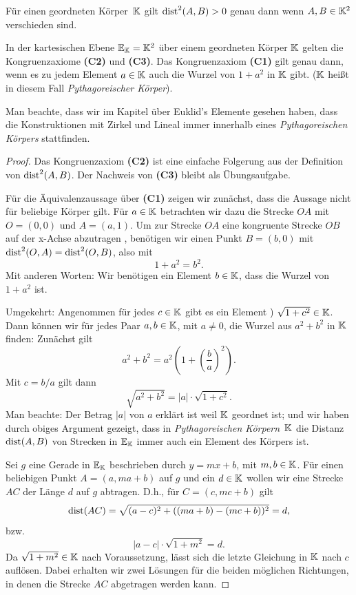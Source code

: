 Für einen geordneten Körper~$\mathbb K$ gilt $\operatorname{dist}^2(A,B)>0$ genau dann wenn
$A, B\in \mathbb K^2$ verschieden sind.


\begin{thm}
In der kartesischen Ebene $\mathbb E_{\mathbb K}=\mathbb K^2$ über einem geordneten Körper
$\mathbb K$ gelten die  Kongruenzaxiome {\bf (C2)} und  {\bf (C3)}. Das
Kongruenzaxiom  {\bf (C1)}
gilt genau dann, wenn es zu jedem Element $a\in \mathbb K$ 
auch die Wurzel von $1+a^2$ in $\mathbb K$ gibt. 
($\mathbb K$ heißt in diesem Fall {\em Pythagoreischer Körper}).
\end{thm}


Man beachte, dass wir im Kapitel über Euklid's Elemente gesehen
haben, dass die Konstruktionen mit Zirkel und Lineal immer innerhalb
eines {\em Pythagoreischen Körpers} stattfinden. 



\begin{proof}
Das Kongruenzaxiom  {\bf (C2)} ist eine einfache Folgerung aus der Definition
von $\operatorname{dist}^2(A,B)$. Der Nachweis von  {\bf (C3)} bleibt als Übungsaufgabe. 



Für die Äquivalenzaussage über  {\bf (C1)} zeigen wir zunächst, dass
die Aussage nicht für beliebige Körper gilt.
Für $a\in \mathbb K$ betrachten wir dazu die Strecke $OA$ mit $O=(0,0)$ und
$A=(a,1)$. Um zur Strecke $OA$ eine kongruente Strecke $OB$ auf der
x-Achse \glqq abzutragen \grqq , benötigen wir einen Punkt $B=(b,0)$
mit $\operatorname{dist}^2(O,A)= \operatorname{dist}^2(O,B)$, also mit 
$$
1+a^2 = b^2.
$$
Mit anderen Worten: Wir benötigen ein Element $b\in \mathbb K$, dass die
Wurzel von $1+a^2$ ist.


Umgekehrt: Angenommen für jedes $c\in \mathbb K$ gibt es ein Element )
$\sqrt{1+c^2}\in\mathbb K$.
Dann können wir für jedes Paar $a,b\in \mathbb K$, mit $a\not = 0$,
die Wurzel aus $a^2+b^2$ in $\mathbb K$ finden: Zunächst gilt
$$
a^2+b^2 = a^2 \left(1+ \left(\frac{b}{a}\right)^2 \right).
$$
Mit $c=b/a$ gilt dann
$$
\sqrt{a^2+b^2} = |a| \cdot \sqrt{1+c^2}
.
$$
Man beachte: Der Betrag $|a|$ von $a$ erklärt ist weil $\mathbb K$
geordnet ist; und wir haben durch obiges Argument gezeigt, dass in
{\em Pythagoreischen Körpern}~$\mathbb K$ die
Distanz $\operatorname{dist}(A,B)$ von Strecken in $\mathbb E_{\mathbb K}$ immer auch ein Element des Körpers ist.

Sei $g$ eine Gerade in $\mathbb E_{\mathbb K}$ beschrieben durch $y=mx+b$, mit
$m,b\in\mathbb K$.
Für einen beliebigen Punkt $A=(a,ma+b)$ auf $g$ und ein $d\in \mathbb K$ wollen wir
eine Strecke $AC$ der Länge $d$ auf $g$ abtragen. D.h., für
$C=(c,mc+b)$ gilt
$$
\operatorname{dist}(AC)=\sqrt{(a-c)^2+( (ma+b) - (mc+b) )^2} = d,
$$
bzw.
$$
|a-c|\cdot \sqrt{1+m^2} = d.
$$
Da $\sqrt{1+m^2}\in\mathbb K$ nach Voraussetzung, lässt sich die letzte
Gleichung in $\mathbb K$ nach $c$ auflösen. Dabei erhalten wir zwei Lösungen
für die beiden möglichen Richtungen, in denen die Strecke $AC$
abgetragen werden kann.
\end{proof}




